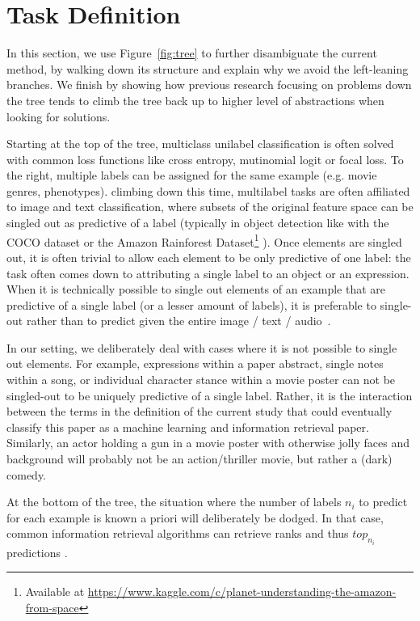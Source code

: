 
\section{Task Definition}

In this section, we use Figure~\ref{fig:tree} to further disambiguate the current method, by walking down its structure and explain why we avoid the left-leaning branches. We finish by showing how previous research focusing on problems down the tree tends to climb the tree back up to higher level of abstractions when looking for solutions.

Starting at the top of the tree, multiclass unilabel classification is often solved with common loss functions like cross entropy, mutinomial logit or focal loss. To the right, multiple labels can be assigned for the same example (e.g. movie genres, phenotypes). climbing down this time, multilabel tasks are often affiliated to image and text classification, where subsets of the original feature space can be singled out as predictive of a label (typically in object detection like with the COCO dataset  \cite{COCO} or the Amazon Rainforest Dataset\footnote{Available at \url{https://www.kaggle.com/c/planet-understanding-the-amazon-from-space}}  ). Once elements are singled out, it is often trivial to allow each element to be only predictive of one label: the task often comes down to attributing a single label to an object or an expression. When it is technically possible to single out elements of an example that are predictive of a single label (or a lesser amount of labels), it is preferable to single-out rather than to predict given the entire image / text / audio~\cite{multiInstanceMultiLabel}.

In our setting, we deliberately deal with cases where it is not possible to single out elements. For example, expressions within a paper abstract, single notes within a song, or individual character stance within a movie poster can not be singled-out to be uniquely predictive of a single label. Rather, it is the interaction between the terms in the definition of the current study that could eventually classify this paper as a machine learning and information retrieval paper. Similarly, an actor holding a gun in a movie poster with otherwise jolly faces and background will probably not be an action/thriller movie, but rather a (dark) comedy. 

At the bottom of the tree, the situation where the number of labels $n_i$ to predict for each example is known a priori will deliberately be dodged. In that case, common information retrieval algorithms can retrieve ranks and thus $top_{n_i}$ predictions .

